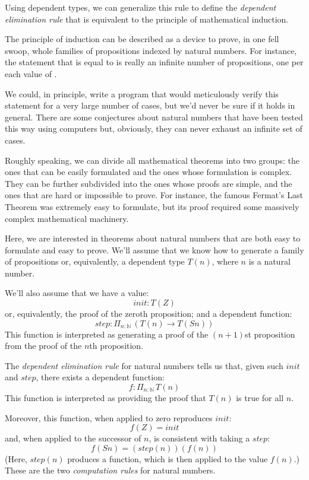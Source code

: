 \documentclass[DaoFP]{subfiles}
\begin{document}
Using dependent types, we can generalize this rule to define the \emph{dependent elimination rule} that is equivalent to the principle of mathematical induction.

The principle of induction can be described as a device to prove, in one fell swoop, whole families of propositions indexed by natural numbers. For instance, the statement that  is equal to  is really an infinite number of propositions, one per each value of . 

We could, in principle, write a program that would meticulously verify this statement for a very large number of cases, but we'd never be sure if it holds in general. There are some conjectures about natural numbers that have been tested this way using computers but, obviously, they can never exhaust an infinite set of cases.

Roughly speaking, we can divide all mathematical theorems into two groups: the ones that can be easily formulated and the ones whose formulation is complex. They can be further subdivided into the ones whose proofs are simple, and the ones that are hard or impossible to prove. For instance, the famous Fermat's Last Theorem was extremely easy to formulate, but its proof required some massively complex mathematical machinery. 

Here, we are interested in theorems about natural numbers that are both easy to formulate and easy to prove. We'll assume that we know how to generate a family of propositions or, equivalently, a dependent type $T(n)$, where $n$ is a natural number. 

We'll also assume that we have a value:
\[\mathit{init} \colon T(Z) \]
or, equivalently, the proof of the zeroth proposition; and a dependent function:
\[\mathit{step} \colon \Pi_{n:\mathbb{N}}\,\left(T(n) \to T(S n)\right) \]
This function is interpreted as generating a proof of the $(n + 1)$st proposition from the proof of the $n$th proposition.

The \emph{dependent elimination rule} for natural numbers tells us that, given such $\mathit{init}$ and $\mathit{step}$, there exists a dependent function:
\[f \colon \Pi_{n:\mathbb{N}} \, T(n) \]
This function is interpreted as providing the proof that $T(n)$ is true for all $n$.

Moreover, this function, when applied to zero reproduces $\mathit{init}$:
\[ f (Z) = \mathit{init} \]
and, when applied to the successor of $n$, is consistent with taking a $\mathit{step}$:
\[ f (S n) = (\mathit{step} (n)) (f (n)) \]
(Here, $\mathit{step}(n)$ produces a function, which is then applied to the value $f(n)$.) These are the two \emph{computation rules} for natural numbers. 
\end{document}
